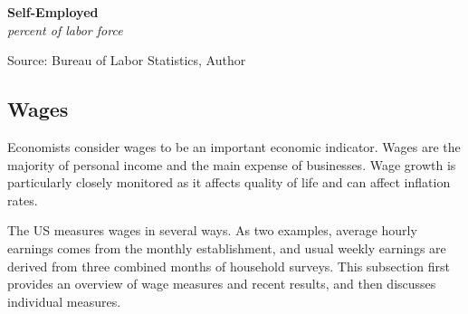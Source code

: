 \documentclass{report}
\makeatletter
\newcommand{\tbllink}[1]{\href{https://raw.githubusercontent.com/bdecon/US-chartbook/master/chartbook/data/#1}{\faTable}}
\newcommand*\short[1]{\expandafter\@gobbletwo\number\numexpr#1\relax}
\newcommand{\absnode}[3]{\node[below right, align=left] at (axis cs: #1,#2) {#3};}
\newcommand{\shdateaxisticks}{
		date coordinates in=x, axis line style={draw=none},
		xmax={2024-01-31},
		max space between ticks=40,	    
		xtick={{1990-01-01}, {1995-01-01}, {2000-01-01}, 
			{2005-01-01}, {2010-01-01}, {2015-01-01}, {2020-01-01}},
		minor xtick={},
		enlarge y limits={0.06}, enlarge x limits={0.01},
		xticklabel style={align=center, yshift=-2pt}, tick label style={inner sep=0pt},
		}
\newcommand{\bbar}[2]{extra #1 ticks = {{#2}}, extra #1 tick labels = ,
		extra #1 tick style = {grid=major, grid style={thick, black!25}},}
\newcommand{\stdline}[4]{\addplot[very thick, no markers, color=#1] 
		table [x=#2, y=#3, col sep=comma] {#4};	}
\newcommand{\rbars}{
		\fill[color=black!10] (axis cs:{1990-07-01},\pgfkeysvalueof{/pgfplots/ymin})
			rectangle (axis cs:{1991-03-01}, \pgfkeysvalueof{/pgfplots/ymax});
		\fill[color=black!10] (axis cs:{2007-12-01},\pgfkeysvalueof{/pgfplots/ymin})
			rectangle (axis cs:{2009-07-01}, \pgfkeysvalueof{/pgfplots/ymax});
		\fill[color=black!10] (axis cs:{2001-03-01},\pgfkeysvalueof{/pgfplots/ymin})
			rectangle (axis cs:{2001-11-01}, \pgfkeysvalueof{/pgfplots/ymax});
		\fill[color=black!10] (axis cs:{2020-02-01},\pgfkeysvalueof{/pgfplots/ymin})
			rectangle (axis cs:{2020-05-01}, \pgfkeysvalueof{/pgfplots/ymax});}
\makeatother
\begin{document}
{\begin{minipage}{1.0\textwidth}

\end{minipage}

\begin{minipage}{0.475\textwidth}
\normalsize \textbf{Self-Employed}\\
\footnotesize{\textit{percent of labor force}}
\vspace{3.6cm}

\hspace{2mm} 

\footnotesize{Source: Bureau of Labor Statistics, Author} \hfill \tbllink{selfemp.csv} \ \ 
\end{minipage} \hspace{5mm}
\begin{minipage}{0.24\textwidth}
\small 
\end{minipage}
\newpage
\vspace*{-11mm}

\begin{minipage}{1.0\textwidth}  
\subsection*{Wages} \hypertarget{labw}{\label{labw}}
\small Economists consider wages to be an important economic indicator. Wages are the majority of personal income and the main expense of businesses. Wage growth is particularly closely monitored as it affects quality of life and can affect inflation rates. 

The US measures wages in several ways. As two examples, average hourly earnings comes from the monthly establishment, and usual weekly earnings are derived from three combined months of household surveys. This subsection first provides an overview of wage measures and recent results, and then discusses individual measures. 
\vspace{1mm}


\end{minipage}}
\end{document}
